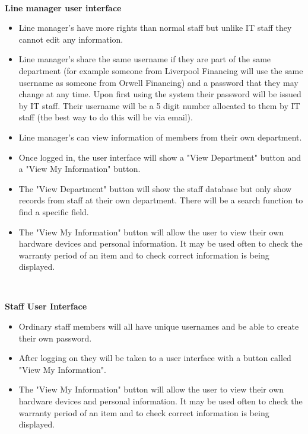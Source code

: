 \

\textbf{Line manager user interface}

\begin{itemize}
\item Line manager's have more rights than normal staff but unlike IT staff they cannot edit any information.
\item Line manager's share the same username if they are part of the same department (for example someone from Liverpool Financing will use the same username as someone from Orwell Financing) and a password that they may change at any time. Upon first using the system their password will be issued by IT staff. Their username will be a 5 digit number allocated to them by IT staff (the best way to do this will be via email). 
\item Line manager's can view information of members from their own department.
\item Once logged in, the user interface will show a "View Department" button and a "View My Information" button.
\item The "View Department" button will show the staff database but only show records from staff at their own department. There will be a search function to find a specific field.
\item The "View My Information" button will allow the user to view their own hardware devices and personal information. It may be used often to check the warranty period of an item and to check correct information is being displayed.
\end{itemize}

\

\textbf{Staff User Interface}
\begin{itemize}
\item Ordinary staff members will all have unique usernames and be able to create their own password.
\item After logging on they will be taken to a user interface with a button called "View My Information".
\item The "View My Information" button will allow the user to view their own hardware devices and personal information. It may be used often to check the warranty period of an item and to check correct information is being displayed.
\end{itemize}

\

